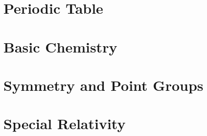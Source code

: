 \documentclass[a4paper, 11pt]{book}
\newcommand{\1}{\opr{\mathds{1}}}
\begin{document}
	\chapter{Periodic Table}\label{app:E}
		
	\chapter{Basic Chemistry}
		
%		
	\chapter{Symmetry and Point Groups}\label{app:groups}
		
	\chapter{Special Relativity}
		
		
		
\nocite{quantistica,landau3,statistica,struttura,struttura1,griffmq,sakuraimqm,patritesta,molekulphysik,complessa,griffpart,nucleare,relativitat,relativita,pdg,griffpart,thermoditt}
\printbibliography
\end{document}
